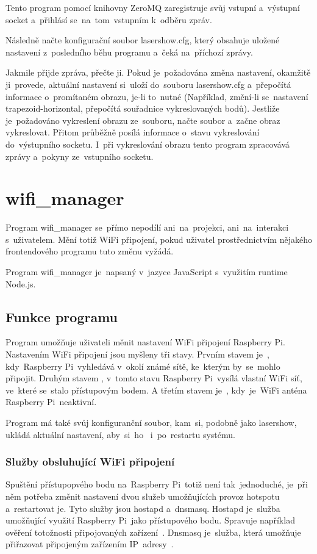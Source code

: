 \restoregeometry

Tento program pomocí knihovny ZeroMQ zaregistruje svůj vstupní a~výstupní socket a~přihlásí se~na~tom~vstupním k~odběru zpráv.

Následně načte konfigurační soubor lasershow.cfg, který obsahuje uložené nastavení z~posledního běhu programu a~čeká na~příchozí zprávy.

Jakmile přijde zpráva, přečte ji. Pokud je~požadována změna nastavení, okamžitě ji~provede, aktuální nastavení si~uloží do~souboru lasershow.cfg a~přepočítá informace o~promítaném obrazu, je-li to~nutné (Například, změní-li se~nastavení trapezoid-horizontal, přepočítá souřadnice vykreslovaných bodů).
Jestliže je~požadováno vykreslení obrazu ze~souboru, načte soubor a~začne obraz vykreslovat.
Přitom průběžně posílá informace o~stavu vykreslování do~výstupního socketu.
I~při vykreslování obrazu tento program zpracovává zprávy a~pokyny ze~vstupního socketu.

\section{wifi\_manager}

Program wifi\_manager se~přímo nepodílí ani~na~projekci, ani~na~interakci s~uživatelem. Mění totiž WiFi připojení, pokud uživatel prostřednictvím nějakého frontendového programu tuto změnu vyžádá.

Program wifi\_manager je~napsaný v~jazyce JavaScript s~využitím runtime Node.js.

\subsection{Funkce programu}
Program umožňuje uživateli měnit nastavení WiFi připojení Raspberry Pi. Nastavením WiFi připojení jsou myšleny tři stavy.
Prvním stavem je~, kdy~Raspberry Pi~vyhledává v~okolí známé sítě, ke~kterým by~se~mohlo připojit.
Druhým stavem , v~tomto stavu Raspberry Pi~vysílá vlastní WiFi síť, ve~které se~stalo přístupovým bodem.
A třetím stavem je~, kdy~je~WiFi anténa Raspberry Pi~neaktivní.

Program má také svůj konfiguranční soubor, kam~si, podobně jako lasershow, ukládá aktuální nastavení, aby~si~ho~ i~po~restartu systému.

\subsubsection{Služby obsluhující WiFi připojení}
Spuštění přístupopvého bodu na~Raspberry Pi~totiž není tak~jednoduché, je~při něm potřeba změnit nastavení dvou služeb umožňujících provoz hotspotu a~restartovat je. Tyto služby jsou hostapd a~dnsmasq.
Hostapd je~služba umožňující využití Raspberry Pi~jako přístupového bodu. Spravuje například ověření totožnosti připojovaných zařízení~\cite{hostapd}. Dnsmasq je~služba, která umožňuje přiřazovat připojeným zařízením IP~adresy~\cite{dnsmasq}.

